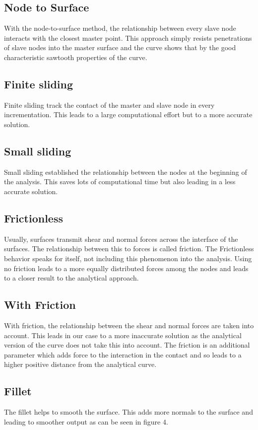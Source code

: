 \documentclass[12pt]{article}
\begin{document}
\subsection{Node to Surface}
With the node-to-surface method, the relationship between every slave node interacts with the closest master point. This approach simply resists penetrations of slave nodes into the master surface and the curve shows that by the good characteristic sawtooth properties of the curve.
\subsection{Finite sliding}
Finite sliding track the contact of the master and slave node in every incrementation. This leads to a large computational effort but to a more accurate solution.
\subsection{Small sliding}
Small sliding established the relationship between the nodes at the beginning of the analysis. This saves lots of computational time but also leading in a less accurate solution.
\subsection{Frictionless}
Usually, surfaces transmit shear and normal forces across the interface of the surfaces. The relationship between this to forces is called friction. The Frictionless behavior speaks for itself, not including this phenomenon into the analysis. Using no friction leads to a more equally distributed forces among the nodes and leads to a closer result to the analytical approach.
\subsection{With Friction}
With friction, the relationship between the shear and normal forces are taken into account. This leads in our case to a more inaccurate solution as the analytical version of the curve does not take this into account. The friction is an additional parameter which adds force to the interaction in the contact and so leads to a higher positive distance from the analytical curve.
\subsection{Fillet}
The fillet helps to smooth the surface. This adds more normals to the surface and leading to smoother output as can be seen in figure 4. 
\end{document}
